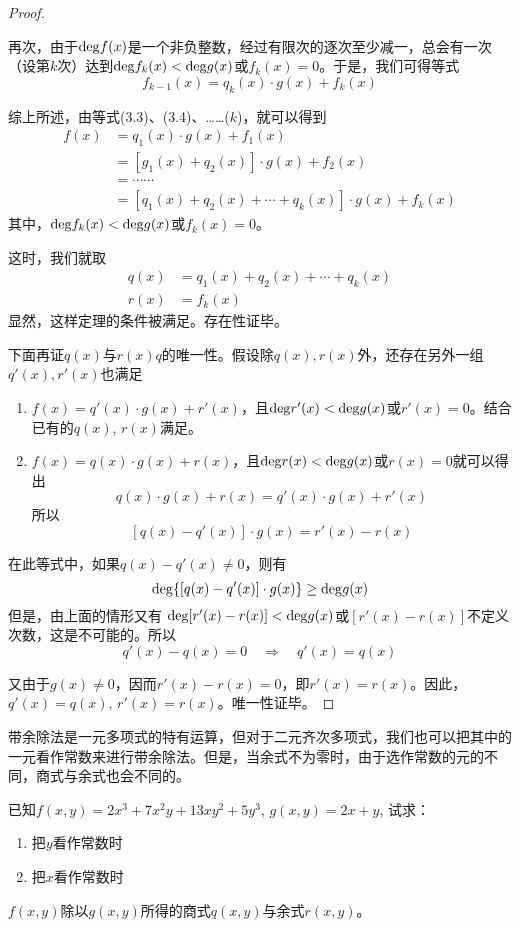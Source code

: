 \begin{proof}
\begin{enumerate}
再次，由于${\rm deg}f(x)$是一个非负整数，经过有限次的逐次至少减一，总会有一次（设第$k$次）达到${\rm deg}f_k(x)<{\rm deg}g(x)$或$f_k(x)=0$。于是，我们可得等式
\begin{equation*}
    f_{k-1}(x)=q_k(x)\cdot g(x)+f_k(x) \tag{$k$}
\end{equation*}

综上所述，由等式(3.3)、(3.4)、……($k$)，就可以得到
\[\begin{split}
   f(x)&=q_1(x)\cdot g(x)+f_1(x)\\
   &=[g_1(x)+q_2(x)]\cdot g(x)+f_2(x)\\ 
&=\cdots\cdots\\
&=[q_1(x)+q_2(x)+\cdots+q_k(x)]\cdot g(x)+f_k(x)
\end{split}\]
其中，${\rm deg}f_k(x)<{\rm deg}g(x)$或$f_k(x)=0$。

这时，我们就取
\[\begin{split}
    q(x)&=q_1(x)+q_2(x)+\cdots +q_k(x)\\
    r(x)&=f_k(x)
\end{split}\]
显然，这样定理的条件被满足。存在性证毕。
\end{enumerate}

下面再证$q(x)$与$r(x)q$的唯一性。假设除$q(x),r(x)$外，还存在另外一组$q'(x),r'(x)$也满足
\begin{enumerate}
    \item $f(x)=q'(x)\cdot g(x)+r'(x)$，且${\rm deg}r'(x)<{\rm deg}g(x)$或$r'(x)=0$。结合已有的$q(x)$, $r(x)$满足。
    \item $f(x)=q(x)\cdot g(x)+r(x)$，且${\rm deg}r(x)<{\rm deg}g(x)$或$r(x)=0$就可以得出
\[q(x)\cdot g(x)+r(x)=q'(x)\cdot g(x)+r'(x)\]
所以
\[[q(x)-q'(x)]\cdot g(x)=r'(x)-r(x)\]
\end{enumerate}

在此等式中，如果$q(x)-q'(x)\ne 0$，则有
\[{\rm deg}\{[q(x)-q'(x)]\cdot g(x)\}\ge {\rm deg}g(x)\]
但是，由上面的情形又有
${\rm deg}[r'(x)-r(x)]<{\rm deg}g(x)$或$[r'(x)-r(x)]$不定义次数，这是不可能的。所以
\[q'(x)-q(x)=0\quad \Rightarrow\quad q'(x)=q(x)\]

又由于$g(x)\ne 0$，因而$r'(x)-r(x)=0$，即$r'(x)=r(x)$。因此，$q'(x)=q(x)$, $r'(x)=r(x)$。唯一性证毕。
\end{proof}

带余除法是一元多项式的特有运算，但对于二元齐次多项式，我们也可以把其中的一元看作常数来进行带余除法。但是，当余式不为零时，由于选作常数的元的不同，商式与余式也会不同的。

\begin{example}
 已知$f(x,y)=2x^3+7x^2y+13xy^2+5y^3$, $g(x,y)=2x+y$, 试求：
 \begin{enumerate}
     \item 把$y$看作常数时
     \item 把$x$看作常数时
 \end{enumerate}
$f(x,y)$除以$g(x,y)$所得的商式$q(x,y)$与余式$r(x,y)$。
\end{example}

